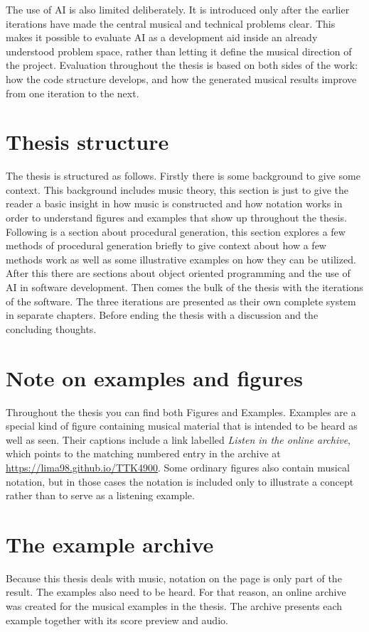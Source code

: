 The use of \ac{AI} is also limited deliberately. It is introduced only after the earlier iterations have made the central musical and technical problems clear. This makes it possible to evaluate \ac{AI} as a development aid inside an already understood problem space, rather than letting it define the musical direction of the project. Evaluation throughout the thesis is based on both sides of the work: how the code structure develops, and how the generated musical results improve from one iteration to the next.

\section{Thesis structure}
The thesis is structured as follows. Firstly there is some background to give some context. This background includes music theory, this section is just to give the reader a basic insight in how music is constructed and how notation works in order to understand figures and examples that show up throughout the thesis. Following is a section about procedural generation, this section explores a few methods of procedural generation briefly to give context about how a few methods work as well as some illustrative examples on how they can be utilized. After this there are sections about object oriented programming and the use of \ac{AI} in software development. Then comes the bulk of the thesis with the iterations of the software. The three iterations are presented as their own complete system in separate chapters. Before ending the thesis with a discussion and the concluding thoughts. \\

\section{Note on examples and figures}
Throughout the thesis you can find both Figures and Examples. Examples are a special kind of figure containing musical material that is intended to be heard as well as seen. Their captions include a link labelled \textit{Listen in the online archive}, which points to the matching numbered entry in the archive at \url{https://lima98.github.io/TTK4900}. Some ordinary figures also contain musical notation, but in those cases the notation is included only to illustrate a concept rather than to serve as a listening example.

\section{The example archive}
Because this thesis deals with music, notation on the page is only part of the result. The examples also need to be heard. For that reason, an online archive was created for the musical examples in the thesis. The archive presents each example together with its score preview and audio.

